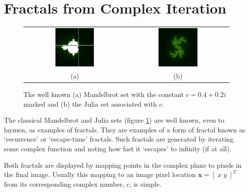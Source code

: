 \section{Fractals from Complex Iteration}

\begin{figure}
\centering
\begin{tabular}{c@{$\quad$}c}
\includegraphics[width=0.4\textwidth]{euc_mandel_julia_pos} 
 & \includegraphics[width=0.4\textwidth]{julia_euc} \\
                          (a) & (b)
\end{tabular}
\caption{\label{fig:euclidean_sets}The well known (a) Mandelbrot set with
  the constant $c = 0.4 + 0.2i$ marked and (b) the Julia
  set associated with $c$.}
\end{figure}

The classical Mandelbrot and Julia sets (figure \ref{fig:euclidean_sets}) are
well known, even to laymen, as examples of fractals. They are
examples of a form of fractal known as `recurrence' or `escape-time'
fractals.  Such fractals are generated by iterating some complex function and
noting how fast it `escapes' to infinity (if at all).

Both fractals are displayed by mapping points in the complex plane to
pixels in the final image.
Usually this mapping to an image pixel location $\mathbf{x} = [\; x\;y \;]^T$
from its corresponding complex number, $c$, is simple.

